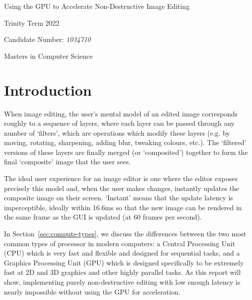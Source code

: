 \documentclass[12pt]{article}
\begin{document}
\begin{titlepage}
    \begin{center}
        \vspace*{1.5in}

        \Huge
        Using the GPU to Accelerate Non-Destructive Image Editing

        \vspace*{2in}

        \Large

        Trinity Term 2022

        \vspace*{0.25in}
        Candidate Number: \emph{1034710}

        \vspace*{0.25in}
        Masters in Computer Science
    \end{center}
\end{titlepage}



\pagebreak

\tableofcontents



\pagebreak

\section{Introduction}

When image editing, the user's mental model of an edited image corresponds roughly to a sequence of
layers, where each layer can be passed through any number of `filters', which are operations which
modify these layers (e.g. by moving, rotating, sharpening, adding blur, tweaking colours, etc.).
The `filtered' versions of these layers are finally merged (or `composited') together to form the
final `composite' image that the user sees.

The ideal user experience for an image editor is one where the editor exposes precisely this model
and, when the user makes changes, instantly updates the composite image on their screen.  `Instant'
means that the update latency is imperceptible, ideally within 16.6ms so that the new image can be
rendered in the same frame as the GUI is updated (at 60 frames per second).

In Section~\ref{sec:compute-types}, we discuss the differences between the two most common types of
processor in modern computers: a Central Processing Unit (CPU) which is very fast and
flexible and designed for sequential tasks, and a Graphics Processing Unit (GPU) which is designed
specifically to be extremely fast at 2D and 3D graphics and other highly parallel tasks.  As this
report will show, implementing purely non-destructive editing with low enough latency is nearly
impossible without using the GPU for acceleration.
\end{document}
